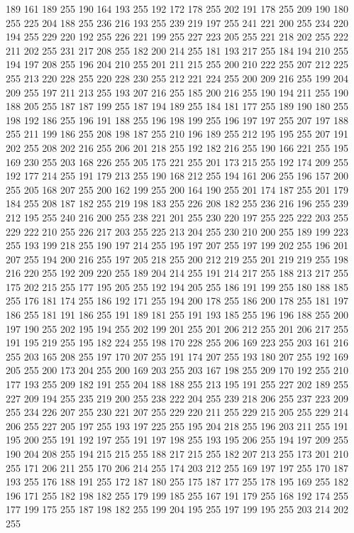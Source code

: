 189 161 189 255 190 164 193 255 192 172 178 255 202 191 178 255 209 190 180 255 225 204 188 255 236 216 193 255 239 219 197 255 241 221 200 255 234 220 194 255 229 220 192 255 226 221 199 255 227 223 205 255 221 218 202 255 222 211 202 255 231 217 208 255
182 200 214 255 181 193 217 255 184 194 210 255 194 197 208 255 196 204 210 255 201 211 215 255 200 210 222 255 207 212 225 255 213 220 228 255 220 228 230 255 212 221 224 255 200 209 216 255 199 204 209 255 197 211 213 255 193 207 216 255 185 200 216 255
190 194 211 255 190 188 205 255 187 187 199 255 187 194 189 255 184 181 177 255 189 190 180 255 198 192 186 255 196 191 188 255 196 198 199 255 196 197 197 255 207 197 188 255 211 199 186 255 208 198 187 255 210 196 189 255 212 195 195 255 207 191 202 255
208 202 216 255 206 201 218 255 192 182 216 255 190 166 221 255 195 169 230 255 203 168 226 255 205 175 221 255 201 173 215 255 192 174 209 255 192 177 214 255 191 179 213 255 190 168 212 255 194 161 206 255 196 157 200 255 205 168 207 255 200 162 199 255
200 164 190 255 201 174 187 255 201 179 184 255 208 187 182 255 219 198 183 255 226 208 182 255 236 216 196 255 239 212 195 255 240 216 200 255 238 221 201 255 230 220 197 255 225 222 203 255 229 222 210 255 226 217 203 255 225 213 204 255 230 210 200 255
189 199 223 255 193 199 218 255 190 197 214 255 195 197 207 255 197 199 202 255 196 201 207 255 194 200 216 255 197 205 218 255 200 212 219 255 201 219 219 255 198 216 220 255 192 209 220 255 189 204 214 255 191 214 217 255 188 213 217 255 175 202 215 255
177 195 205 255 192 194 205 255 186 191 199 255 180 188 185 255 176 181 174 255 186 192 171 255 194 200 178 255 186 200 178 255 181 197 186 255 181 191 186 255 191 189 181 255 191 193 185 255 196 196 188 255 200 197 190 255 202 195 194 255 202 199 201 255
201 206 212 255 201 206 217 255 191 195 219 255 195 182 224 255 198 170 228 255 206 169 223 255 203 161 216 255 203 165 208 255 197 170 207 255 191 174 207 255 193 180 207 255 192 169 205 255 200 173 204 255 200 169 203 255 203 167 198 255 209 170 192 255
210 177 193 255 209 182 191 255 204 188 188 255 213 195 191 255 227 202 189 255 227 209 194 255 235 219 200 255 238 222 204 255 239 218 206 255 237 223 209 255 234 226 207 255 230 221 207 255 229 220 211 255 229 215 205 255 229 214 206 255 227 205 197 255
193 197 225 255 195 204 218 255 196 203 211 255 191 195 200 255 191 192 197 255 191 197 198 255 193 195 206 255 194 197 209 255 190 204 208 255 194 215 215 255 188 217 215 255 182 207 213 255 173 201 210 255 171 206 211 255 170 206 214 255 174 203 212 255
169 197 197 255 170 187 193 255 176 188 191 255 172 187 180 255 175 187 177 255 178 195 169 255 182 196 171 255 182 198 182 255 179 199 185 255 167 191 179 255 168 192 174 255 177 199 175 255 187 198 182 255 199 204 195 255 197 199 195 255 203 214 202 255
